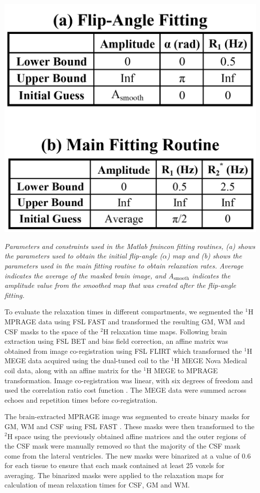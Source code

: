 \begin{table}
    \centering
    \includegraphics[width=0.7\linewidth]{Figures/D2O/Fit_Params.png}
    \caption{\textit{Parameters and constraints used in the Matlab fmincon fitting routines, (a) shows the parameters used to obtain the initial flip-angle ($\alpha$) map and (b) shows the parameters used in the main fitting routine to obtain relaxation rates. Average indicates the average of the masked brain image, and A$_\text{smooth}$ indicates the amplitude value from the smoothed map that was created after the flip-angle fitting.}}
    \label{fig:D2O:fit}
\end{table}

To evaluate the relaxation times in different compartments, we segmented the $^1$H \ac{MPRAGE} data using FSL FAST \cite{Zhang2001SegmentationAlgorithm} and transformed the resulting \ac{GM}, \ac{WM} and \ac{CSF} masks to the space of the $^2$H relaxation time maps. Following brain extraction using FSL BET \cite{Smith2002FastExtraction} and bias field correction, an affine matrix was obtained from image co-registration using FSL FLIRT \cite{Jenkinson2001AImages,Jenkinson2002ImprovedImages} which transformed the $^1$H \ac{MEGE} data acquired using the dual-tuned coil to the $^1$H \ac{MEGE} Nova Medical coil data, along with an affine matrix for the $^1$H \ac{MEGE} to \ac{MPRAGE} transformation. Image co-registration was linear, with six degrees of freedom and used the correlation ratio cost function \cite{RocheTheRegistration}. The \ac{MEGE} data were summed across echoes and repetition times before co-registration.

The brain-extracted \ac{MPRAGE} image was segmented to create binary masks for \ac{GM}, \ac{WM} and \ac{CSF} using FSL FAST \cite{Zhang2001SegmentationAlgorithm}. These masks were then transformed to the $^2$H space using the previously obtained affine matrices and the outer regions of the CSF mask were manually removed so that the majority of the CSF mask come from the lateral ventricles. The new masks were binarized at a value of 0.6 for each tissue to ensure that each mask contained at least 25 voxels for averaging. The binarized masks were applied to the relaxation maps for calculation of mean relaxation times for \ac{CSF}, \ac{GM} and \ac{WM}.

